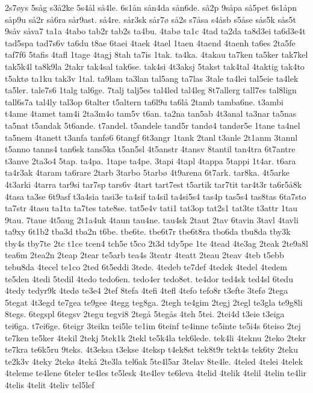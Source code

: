 {2s7øys
5såg
s3å2ke
5s4ål
så4le.
6s1ån
sån4da
sån6de.
så2p
9såpa
så5pet
6s1åpn
såp9u
så2r
så6ra
sår9ast.
så4re.
sår3sk
sår7ø
så2s
s7åsa
s4åsb
s5åse
sås5k
sås5t
9såv
såva7
ta1a
4tabo
tab2r
tab2s
ta4bu.
4tabø
ta1c
4tad
ta2da
ta8d3ei
ta6d3e4t
tad5spa
tad7s6v
ta6du
t8ae
6taei
4taek
4tael
1taen
4taend
4taenh
ta6es
2ta5fe
taf7f6
5tafis
4tafl
1tage
4tagj
8tah
ta7is
1tak.
ta4ka.
4takau
ta7ken
ta5ker
tak7kel
tak5k4l
ta8k9la
2takr
tak4sal
tak6se.
tak4si
4t3aksj
5takst
tak4tal
4taktig
tak4to
t5aktø
ta1ku
tak3v
1tal.
ta9lam
ta3lan
tal5ang
ta7las
3tale
ta4lei
tal5eie
ta4lek
ta5ler.
tale7s6
1talg
tal6ge.
7talj
talj5es
tal4led
tal4leg
8t7allerg
tall7es
tal8lign
tall6s7a
tal4ly
tal3op
6talter
t5altern
ta6l9u
ta6lå
2tamb
tamba6ne.
t3ambi
t4ame
4tamet
tam4i
2ta3m4o
tam5v
t6an.
ta2na
tan5ab
4t3anal
ta3nar
ta5nas
ta5nat
t5andak
5t6ande.
t7andel.
t5andele
tand5r
tandø4
tandør5e
1tane
ta4nel
ta5nem
4tanett
t3anfa
tanfø6
6tangf
6t3angr
1tank
2tanl
t3anle
2t1anm
3tannl
t5anno
tanns4
tan6sk
tans5ka
t5an5sl
4t5anstr
4tansv
8tantil
tan4tra
6t7antre
t3anve
2ta3o4
5tap.
ta4pa.
1tape
ta4pe.
3tapi
4tapl
4tappa
5tappi
1t4ar.
t6ara
ta4r3ak
4taram
ta6rare
2tarb
3tarbo
5tarbø
4t9arena
6t7ark.
tar8ka.
4t5arke
4t3arki
4tarra
tar9si
tar7sp
tars6v
4tart
tart7est
t5artik
tar7tit
tar4t3r
ta6r5å8k
4tasa
ta3se
6t9asf
t3a4sia
tasi3e
ta4sif
ta4sil
ta4si5s4
tas4p
tas5s4
tas8tas
6ta7sto
ta7str
4tasu
ta1ta
ta7tes
tate8se.
tat5e4v
tati1
tat3op
tat2s1
tat3te
t3attr
1tau
9tau.
7taue
4t5aug
2t1a4uk
4taun
tau4ne.
tau4sk
2taut
2tav
6tavin
3tavl
4tavli
ta9xy
6t1b2
tba3d
tba2n
t6be.
tbe6te.
tbe6t7r
tbe6t8ra
tbo6da
tbu8da
tby3k
tby4s
tby7te
2tc
t1ce
tcen4
tch5e
t5co
2t3d
tdy5pe
1te
4tead
4te3ag
2teak
2te9a8l
tea6m
2tea2n
2teap
2tear
te5arb
tea4s
3teatr
4teatt
2teau
2teav
4teb
t5ebb
tebu8da
4tecel
te1co
2ted
6t5eddi
3tede.
4tedeb
te7def
4tedek
4tedel
4tedem
te5den
4tedi
5tedil
4tedo
tedo6en.
tedo4er
tedo8et.
te4dor
ted4sk
ted4sl
6tedu
4tedy
tedyr9k
4tedø
te3e4
2tef
8tefa
4tefi
4tefl
4tefo
tefo8r
t3efte
3tefø
2tega
5tegat
4t3egd
te7gea
te9gee
4tegg
teg8ga.
2tegh
te4gim
2tegj
2tegl
te3gla
te9g8li
8tegs.
6tegspl
6tegsv
2tegu
tegvi8
2tegå
5tegås
4teh
5tei.
2tei4d
t3eie
t3eiga
tei6ga.
t7ei6ge.
6teigr
3teikn
tei5le
te1im
6teinf
te4inne
te5inte
te5i4s
6teiso
2tej
te7ken
te5ker
4tekil
2tekj
5tek1k
2tekl
te5k4la
tek6lede.
tek4li
4teknu
2teko
2tekr
te7kra
te6k5ru
9teks.
4t3eksa
t3ekse
4teksp
t4ek8st
tek8t9r
tekt4s
tek6ty
2teku
te2k3v
4teky
2tekø
4tekå
2te3la
tel6ak
5te4l5ar
3telav
8te4le.
4teled
4telei
4telek
4teleme
te4lene
6teler
te4les
te5lesk
4te4lev
te6leva
4telid
4telik
4telil
4telin
te4lir
4telis
4telit
4teliv
tel5lef
}
